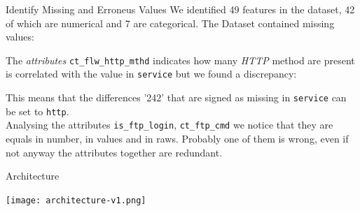 \documentclass[12pt,aspectratio=169,notheorems]{beamer}
\begin{document}
\begin{frame}{Identify Missing and Erroneus Values }
        \scriptsize 
        We identified 49 features in the dataset, 42 of which are numerical and 7 are categorical.
        The Dataset contained missing values: 
        \begin{table}[]
            \centering
        \end{table}        
        The \emph{attributes }\texttt{ct\_flw\_http\_mthd} indicates how many \emph{HTTP} method are present is correlated with 
        the value  in \texttt{service} but we found a discrepancy:
        \begin{table}[]
            \centering
        \end{table}
        This means that the differences '242' that are signed as missing in \texttt{service} can be set to \texttt{http}.  \\
        \vspace{2ex}
        Analysing the attributes \texttt{is\_ftp\_login}, \texttt{ct\_ftp\_cmd} we notice that they are equals in number, in values and in raws.  
        Probably one of them is wrong, even if not anyway the attributes together are redundant.
\end{frame}

\begin{frame}{Architecture}
    \begin{center}
        \texttt{[image: architecture-v1.png]}
    \end{center}
\end{frame}
\end{document}
